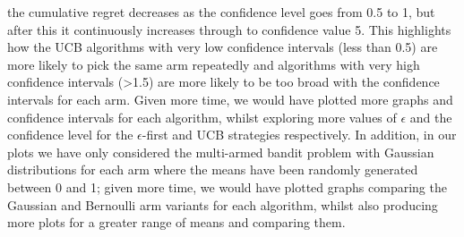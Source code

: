 the cumulative regret decreases as the confidence level goes from 0.5 to 1, but after this it continuously increases through to confidence value 5.
This highlights how the UCB algorithms with very low confidence intervals (less than 0.5) are more likely to pick the same arm repeatedly and algorithms with very high confidence intervals (>1.5) are more likely to be too broad with the confidence intervals for each arm.
\newline
Given more time, we would have plotted more graphs and confidence intervals for each algorithm, whilst exploring more values of $\epsilon$ and the confidence level for the $\epsilon$-first and UCB strategies respectively. 
In addition, in our plots we have only considered the multi-armed bandit problem with Gaussian distributions for each arm where the means have been randomly generated between 0 and 1;
given more time, we would have plotted graphs comparing the Gaussian and Bernoulli arm variants for each algorithm, whilst also producing more plots for a greater range of means and comparing them.